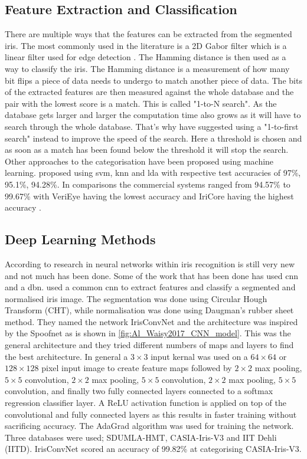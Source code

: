 \subsection{Feature Extraction and Classification}
There are multiple ways that the features can be extracted from the segmented iris. The most commonly used in the literature is a 2D Gabor filter which is a linear filter used for edge detection \citep{Daugman1993}. The Hamming distance is then used as a way to classify the iris. The Hamming distance is a measurement of how many bit flips a piece of data needs to undergo to match another piece of data. The bits of the extracted features are then measured against the whole database and the pair with the lowest score is a match. This is called "1-to-N search". As the database gets larger and larger the computation time also grows as it will have to search through the whole database. That's why \cite{Kuehlkamp2016} have suggested using a "1-to-first search" instead to improve the speed of the search. Here a threshold is chosen and as soon as a match has been found below the threshold it will stop the search. Other approaches to the categorisation have been proposed using machine learning. \cite{Khan2017a} proposed using \gls{svm}, \gls{knn} and \gls{lda} with respective test accuracies of 97\%, 95.1\%, 94.28\%. In comparisons the  commercial systems ranged from 94.57\% to  99.67\% with VeriEye having the lowest accuracy and IriCore having the highest accuracy \citep{Khan2017a} . 

\subsection{Deep Learning Methods}
According to \cite{Zhao2017a} research in neural networks within iris recognition is still very new and not much has been done. Some of the work that has been done has used \gls{cnn} and a \gls{dbn}. \cite{Al-Waisy2017} used a common \gls{cnn} to extract features and classify a segmented and normalised iris image. The segmentation was done using Circular Hough Transform (CHT), while normalisation was done using Daugman's rubber sheet method. They named the network IrisConvNet and the architecture was inspired by the Spoofnet as is shown in \autoref{fig:Al_Waisy2017_CNN_model}. This was the general architecture and they tried different numbers of maps and layers to find the best architecture. In general a $3\times3$ input kernal was used on a $64\times64$ or $128\times128$ pixel input image to create feature maps followed by $2\times2$ max pooling, $5\times5$ convolution, $2\times2$ max pooling, $5\times5$ convolution, $2\times2$ max pooling, $5\times5$ convolution, and finally two fully connected layers connected to a softmax regression classifier layer. A ReLU activation function is applied on top of the convolutional and fully connected layers as this results in faster training without sacrificing accuracy. The AdaGrad algorithm was used for training the network. Three databases were used; SDUMLA-HMT, CASIA-Iris-V3 and IIT Dehli (IITD). IrisConvNet scored an accuracy of 99.82\% at categorising CASIA-Iris-V3. 

